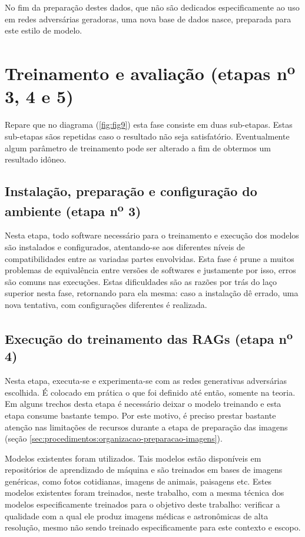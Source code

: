 No fim da preparação destes dados, que não são dedicados especificamente ao uso em redes adversárias geradoras, uma nova base de dados nasce, preparada para este estilo de modelo.

\section{Treinamento e avaliação (etapas n\textsuperscript{o} 3, 4 e 5)}
\label{sec:procedimentos:treinamento-avaliacao}

Repare que no diagrama (\ref{fig:fig9}) esta fase consiste em duas sub-etapas. Estas sub-etapas sãos repetidas caso o resultado não seja satisfatório. Eventualmente algum parâmetro de treinamento pode ser alterado a fim de obtermos um resultado idôneo.

\subsection{Instalação, preparação e configuração do ambiente (etapa n\textsuperscript{o} 3)}

Nesta etapa, todo software necessário para o treinamento e execução dos modelos são instalados e configurados, atentando-se aos diferentes níveis de compatibilidades entre as variadas partes envolvidas. Esta fase é prune a muitos problemas de equivalência entre versões de softwares e justamente por isso, erros são comuns nas execuções. Estas dificuldades são as razões por trás do laço superior nesta fase, retornando para ela mesma: caso a instalação dê errado, uma nova tentativa, com configurações diferentes é realizada.

\subsection{Execução do treinamento das RAGs (etapa n\textsuperscript{o} 4)}

Nesta etapa, executa-se e experimenta-se com as redes generativas adversárias escolhida. É colocado em prática o que foi definido até então, somente na teoria. Em alguns trechos desta etapa é necessário deixar o modelo treinando e esta etapa consume bastante tempo. Por este motivo, é preciso prestar bastante atenção nas limitações de recursos durante a etapa de preparação das imagens (seção \ref{sec:procedimentos:organizacao-preparacao-imagens}). 

Modelos existentes foram utilizados. Tais modelos estão disponíveis em repositórios de aprendizado de máquina e são treinados em bases de imagens genéricas, como fotos cotidianas, imagens de animais, paisagens etc. Estes modelos existentes foram treinados, neste trabalho, com a mesma técnica dos modelos especificamente treinados para o objetivo deste trabalho: verificar a qualidade com a qual ele produz imagens médicas e astronômicas de alta resolução, mesmo não sendo treinado especificamente para este contexto e escopo.


